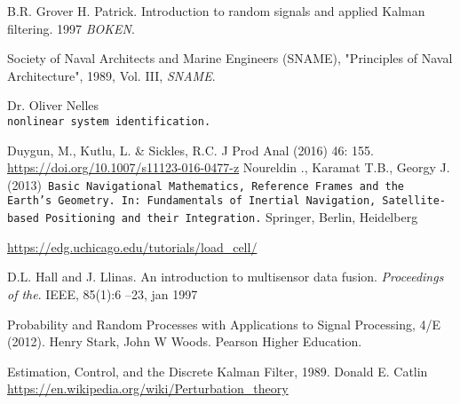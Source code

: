 \begin{thebibliography}{9}
B.R. Grover H. Patrick. Introduction to random signals and applied Kalman filtering. 1997
\textit{BOKEN}. 

Society of Naval Architects and Marine Engineers (SNAME), "Principles of Naval Architecture", 1989, Vol. III,
\textit{SNAME}. 

 
Dr. Oliver Nelles
\\\texttt{nonlinear system identification.}

Duygun, M., Kutlu, L. \& Sickles, R.C. J Prod Anal (2016) 46: 155. \url{https://doi.org/10.1007/s11123-016-0477-z}
Noureldin ., Karamat T.B., Georgy J. (2013)\texttt{ Basic Navigational Mathematics, Reference Frames and the Earth’s Geometry. In: Fundamentals of Inertial Navigation, Satellite-based Positioning and their Integration.} Springer, Berlin, Heidelberg

  \url{https://edg.uchicago.edu/tutorials/load_cell/}

D.L. Hall and J. Llinas. An introduction to multisensor data fusion. 
\textit{Proceedings of
the}. IEEE, 85(1):6 –23, jan 1997

Probability and Random Processes with Applications to Signal Processing, 4/E (2012). 
Henry Stark, John W Woods. Pearson Higher Education. 

Estimation, Control, and the Discrete Kalman Filter, 1989. Donald E. Catlin
  \url{https://en.wikipedia.org/wiki/Perturbation_theory}

\end{thebibliography}
